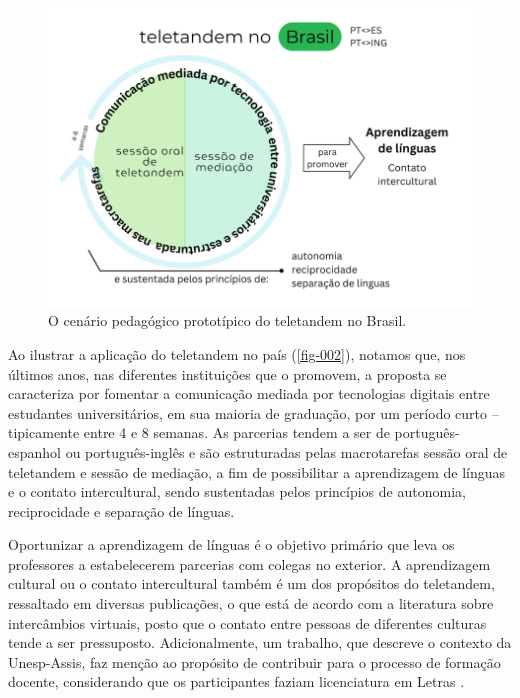 \documentclass[portuguese]{textolivre}
\begin{document}
\begin{figure}[htbp]
  \centering
  \begin{minipage}{.75\textwidth}
    \includegraphics[width=\linewidth]{fig-002.png}
    \caption{O cenário pedagógico prototípico do teletandem no Brasil.}
    \label{fig-002}
  \end{minipage}
\end{figure}

Ao ilustrar a aplicação do teletandem no país (\autoref{fig-002}), notamos que, nos últimos anos, nas diferentes instituições que o promovem, a proposta se caracteriza por fomentar a comunicação mediada por tecnologias digitais entre estudantes universitários, em sua maioria de graduação, por um período curto -- tipicamente entre 4 e 8 semanas. As parcerias tendem a ser de português-espanhol ou português-inglês e são estruturadas pelas macrotarefas sessão oral de teletandem e sessão de mediação, a fim de possibilitar a aprendizagem de línguas e o contato intercultural, sendo sustentadas pelos princípios de autonomia, reciprocidade e separação de línguas.

Oportunizar a aprendizagem de línguas é o objetivo primário que leva os professores a estabelecerem parcerias com colegas no exterior. A aprendizagem cultural ou o contato intercultural também é um dos propósitos do teletandem, ressaltado em diversas publicações, o que está de acordo com a literatura sobre intercâmbios virtuais, posto que o contato entre pessoas de diferentes culturas tende a ser pressuposto. Adicionalmente, um trabalho, que descreve o contexto da Unesp-Assis, faz menção ao propósito de contribuir para o processo de formação docente, considerando que os participantes faziam licenciatura em Letras \cite{cruz2024}.
\end{document}
